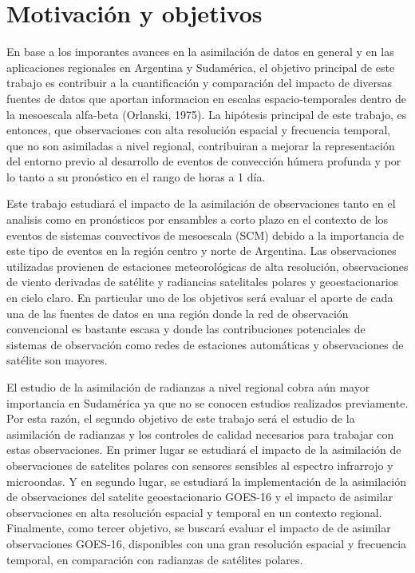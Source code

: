 \documentclass[12pt,oneside]{reedthesis}
\begin{document}
\hypertarget{motivaciuxf3n-y-objetivos}{%
\section{Motivación y objetivos}\label{motivaciuxf3n-y-objetivos}}

En base a los imporantes avances en la asimilación de datos en general y en las aplicaciones regionales en Argentina y Sudamérica, el objetivo principal de este trabajo es contribuir a la cuantificación y comparación del impacto de diversas fuentes de datos que aportan informacion en escalas espacio-temporales dentro de la mesoescala alfa-beta (Orlanski, 1975). La hipótesis principal de este trabajo, es entonces, que observaciones con alta resolución espacial y frecuencia temporal, que no son asimiladas a nivel regional, contribuiran a mejorar la representación del entorno previo al desarrollo de eventos de convección húmera profunda y por lo tanto a su pronóstico en el rango de horas a 1 día.

Este trabajo estudiará el impacto de la asimilación de observaciones tanto en el analisis como en pronósticos por ensambles a corto plazo en el contexto de los eventos de sistemas convectivos de mesoescala (SCM) debido a la importancia de este tipo de eventos en la región centro y norte de Argentina. Las observaciones utilizadas provienen de estaciones meteorológicas de alta resolución, observaciones de viento derivadas de satélite y radiancias satelitales polares y geoestacionarios en cielo claro. En particular uno de los objetivos será evaluar el aporte de cada una de las fuentes de datos en una región donde la red de observación convencional es bastante escasa y donde las contribuciones potenciales de sistemas de observación como redes de estaciones automáticas y observaciones de satélite son mayores.

El estudio de la asimilación de radianzas a nivel regional cobra aún mayor importancia en Sudamérica ya que no se conocen estudios realizados previamente. Por esta razón, el segundo objetivo de este trabajo será el estudio de la asimilación de radianzas y los controles de calidad necesarios para trabajar con estas observaciones. En primer lugar se estudiará el impacto de la asimilación de observaciones de satelites polares con sensores sensibles al espectro infrarrojo y microondas. Y en segundo lugar, se estudiará la implementación de la asimilación de observaciones del satelite geoestacionario GOES-16 y el impacto de asimilar observaciones en alta resolución espacial y temporal en un contexto regional. Finalmente, como tercer objetivo, se buscará evaluar el impacto de de asimilar observaciones GOES-16, disponibles con una gran resolución espacial y frecuencia temporal, en comparación con radianzas de satélites polares.
\end{document}
